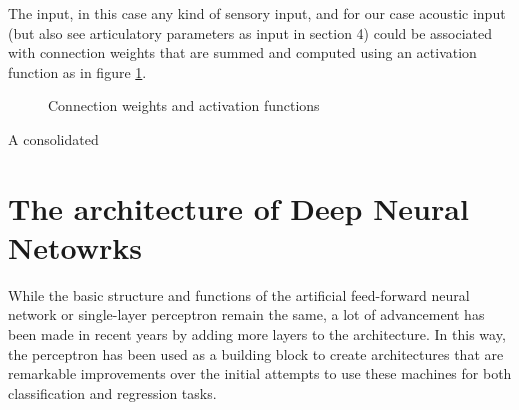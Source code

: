 \documentclass{article}[12pt]
\begin{document}
The input, in this case any kind of sensory input, and for our case acoustic input (but also see articulatory parameters as input in section 4) could be associated with connection weights that are summed and computed using an activation function as in figure \ref{2}.
\begin{figure}
\caption{Connection weights and activation functions}
\label{2}
\end{figure}

A consolidated 





\section{The architecture of Deep Neural Netowrks}
While the basic structure and functions of the artificial feed-forward neural network or single-layer perceptron remain the same, a lot of advancement has been made in recent years by adding more layers to the architecture. In this way, the perceptron has been used as a building block to create architectures that are remarkable improvements over the initial attempts to use these machines for both classification and regression tasks.
\end{document}
